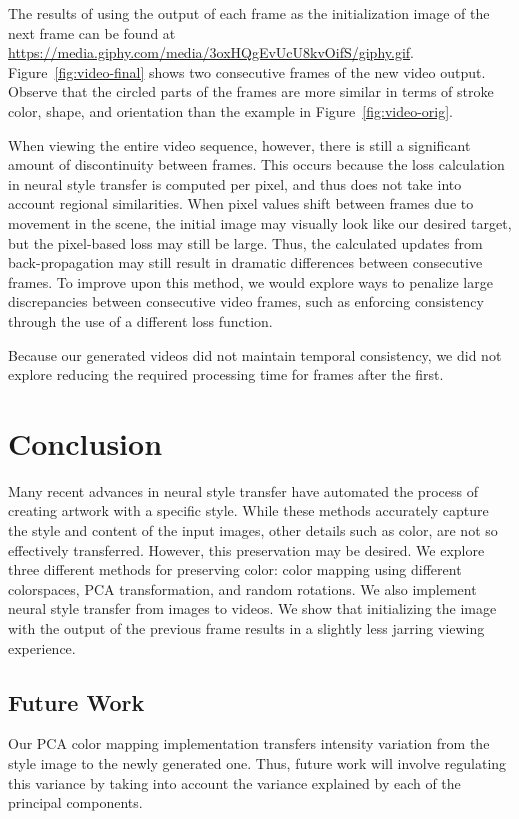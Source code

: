 \documentclass[10pt,twocolumn,letterpaper]{article}
\begin{document}
The results of using the output of each frame as the initialization image of the next frame can be found at \url{https://media.giphy.com/media/3oxHQgEvUcU8kvOifS/giphy.gif}. Figure~\ref{fig:video-final} shows two consecutive frames of the new video output. Observe that the circled parts of the frames are more similar in terms of stroke color, shape, and orientation than the example in Figure~\ref{fig:video-orig}.

When viewing the entire video sequence, however, there is still a significant amount of discontinuity between frames. This occurs because the loss calculation in neural style transfer is computed per pixel, and thus does not take into account regional similarities. When pixel values shift between frames due to movement in the scene, the initial image may visually look like our desired target, but the pixel-based loss may still be large. Thus, the calculated updates from back-propagation may still result in dramatic differences between consecutive frames. To improve upon this method, we would explore ways to penalize large discrepancies between consecutive video frames, such as enforcing consistency through the use of a different loss function.

Because our generated videos did not maintain temporal consistency, we did not explore reducing the required processing time for frames after the first.

\section{Conclusion}
Many recent advances in neural style transfer have automated the process of creating artwork with a specific style. While these methods accurately capture the style and content of the input images, other details such as color, are not so effectively transferred. However, this preservation may be desired. We explore three different methods for preserving color: color mapping using different colorspaces, PCA transformation, and random rotations. We also implement neural style transfer from images to videos. We show that initializing the image with the output of the previous frame results in a slightly less jarring viewing experience.

\subsection{Future Work}
Our PCA color mapping implementation transfers intensity variation from the style image to the newly generated one. Thus, future work will involve regulating this variance by taking into account the variance explained by each of the principal components.
\end{document}
